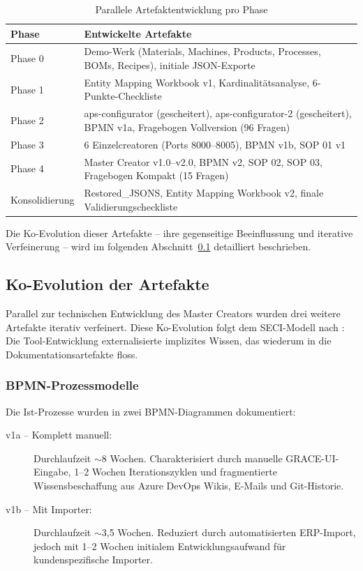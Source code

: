 \begin{table}[h]
\centering
\caption{Parallele Artefaktentwicklung pro Phase}
\label{tab:ParalleleArtefakte}
\begin{tabular}{lp{9cm}}
\hline
\textbf{Phase} & \textbf{Entwickelte Artefakte} \\
\hline
Phase 0 & Demo-Werk (Materials, Machines, Products, Processes, BOMs, Recipes), initiale JSON-Exporte \\
Phase 1 & Entity Mapping Workbook v1, Kardinalitätsanalyse, 6-Punkte-Checkliste \\
Phase 2 & aps-configurator (gescheitert), aps-configurator-2 (gescheitert), BPMN v1a, Fragebogen Vollversion (96 Fragen) \\
Phase 3 & 6 Einzelcreatoren (Ports 8000--8005), BPMN v1b, SOP 01 v1 \\
Phase 4 & Master Creator v1.0--v2.0, BPMN v2, SOP 02, SOP 03, Fragebogen Kompakt (15 Fragen) \\
Konsolidierung & Restored\_JSONS, Entity Mapping Workbook v2, finale Validierungscheckliste \\
\hline
\end{tabular}
\end{table}

Die Ko-Evolution dieser Artefakte -- ihre gegenseitige Beeinflussung und iterative Verfeinerung -- wird im folgenden Abschnitt~\ref{subsec:KoEvolution} detailliert beschrieben.


\subsection{Ko-Evolution der Artefakte}
\label{subsec:KoEvolution}

Parallel zur technischen Entwicklung des Master Creators wurden drei weitere Artefakte iterativ verfeinert. Diese Ko-Evolution folgt dem SECI-Modell nach \cite{nonaka:knowledge_creating_company1995}: Die Tool-Entwicklung externalisierte implizites Wissen, das wiederum in die Dokumentationsartefakte floss.

\subsubsection{BPMN-Prozessmodelle}
\label{subsubsec:BPMN}

Die Ist-Prozesse wurden in zwei BPMN-Diagrammen dokumentiert:

\begin{description}
    \item[v1a -- Komplett manuell:] Durchlaufzeit $\sim$8 Wochen. Charakterisiert durch manuelle GRACE-UI-Eingabe, 1--2 Wochen Iterationszyklen und fragmentierte Wissensbeschaffung aus Azure DevOps Wikis, E-Mails und Git-Historie.

    \item[v1b -- Mit Importer:] Durchlaufzeit $\sim$3,5 Wochen. Reduziert durch automatisierten ERP-Import, jedoch mit 1--2 Wochen initialem Entwicklungsaufwand für kundenspezifische Importer.
\end{description}


